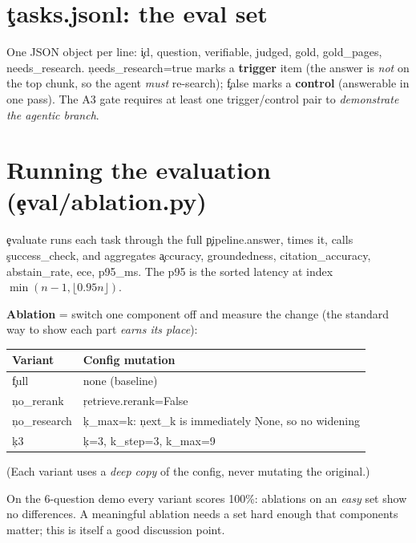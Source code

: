\section{\c{tasks.jsonl}: the eval set}
One JSON object per line: \c{id, question, verifiable, judged, gold, gold\_pages, needs\_research}. \c{needs\_research=true} marks a \textbf{trigger} item (the answer is \emph{not} on the top chunk, so the agent \emph{must} re-search); \c{false} marks a \textbf{control} (answerable in one pass). The A3 gate requires at least one trigger/control pair to \emph{demonstrate the agentic branch}.

\section{Running the evaluation (\c{eval/ablation.py})}
\c{evaluate} runs each task through the full \c{pipeline.answer}, times it, calls \c{success\_check}, and aggregates \c{accuracy, groundedness, citation\_accuracy, abstain\_rate, ece, p95\_ms}. The p95 is the sorted latency at index $\min(n-1,\lfloor0.95n\rfloor)$.

\textbf{Ablation} = switch one component off and measure the change (the standard way to show each part \emph{earns its place}):
\begin{center}\begin{tabular}{@{}ll@{}}\toprule Variant & Config mutation \\ \midrule
\c{full} & none (baseline) \\
\c{no\_rerank} & \c{retrieve.rerank=False} \\
\c{no\_research} & \c{k\_max=k}: \c{next\_k} is immediately \c{None}, so no widening \\
\c{k3} & \c{k=3, k\_step=3, k\_max=9} \\ \bottomrule\end{tabular}\end{center}
(Each variant uses a \emph{deep copy} of the config, never mutating the original.) \begin{gotcha}On the 6-question demo every variant scores 100\%: ablations on an \emph{easy} set show no differences. A meaningful ablation needs a set hard enough that components matter; this is itself a good discussion point.\end{gotcha}

